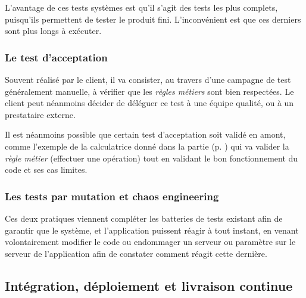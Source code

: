 L'avantage de ces tests systèmes est qu'il s'agit des tests les plus complets, puisqu'ils permettent de tester le produit fini. L'inconvénient est que ces derniers sont plus longs à exécuter.


\subsubsection{Le test d'acceptation}\label{test-acceptation}

Souvent réalisé par le client, il va consister, au travers d'une campagne de test généralement manuelle, à vérifier que les \emph{règles métiers} sont bien respectées. Le client peut néanmoins décider de déléguer ce test à une équipe qualité, ou à un prestataire externe.

Il est néanmoins possible que certain test d'acceptation soit validé en amont, comme l'exemple de la calculatrice donné dans la partie  (p. \pageref{test-composant}) qui va valider la \emph{règle métier} (effectuer une opération) tout en validant le bon fonctionnement du code et ses cas limites.

\subsubsection{Les tests par mutation et chaos engineering}


Ces deux pratiques viennent compléter les batteries de tests existant afin de garantir que le système, et l'application puissent réagir à tout instant, en venant volontairement modifier le code ou endommager un serveur ou paramètre sur le serveur de l'application afin de constater comment réagit cette dernière.

\subsection{Intégration, déploiement et livraison continue}

